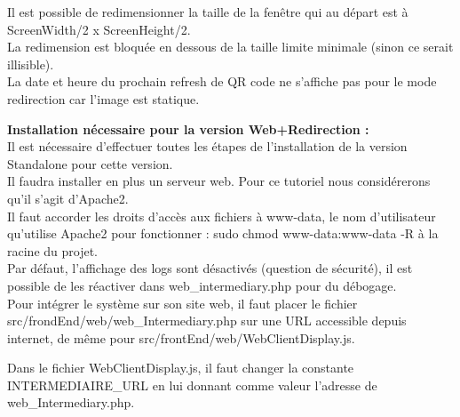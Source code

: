 \documentclass[a4paper,12pt]{article}
\begin{document}
\begin{flushleft}
\begin{enumerate}
    Il est possible de redimensionner la taille de la fenêtre qui au départ est à ScreenWidth/2 x ScreenHeight/2.\\
    La redimension est bloquée en dessous de la taille limite minimale (sinon ce serait illisible).\\

    La date et heure du prochain refresh de QR code ne s'affiche pas pour le mode redirection car l'image est statique.\\
\end{enumerate}
\end{flushleft}

\begin{flushleft}
\textbf{Installation nécessaire pour la version Web+Redirection :}\\
Il est nécessaire d'effectuer toutes les étapes de l'installation de la version Standalone pour cette version.\\
Il faudra installer en plus un serveur web. Pour ce tutoriel nous considérerons qu'il s'agit d'Apache2.\\
Il faut accorder les droits d'accès aux fichiers à www-data, le nom d'utilisateur qu'utilise Apache2 pour fonctionner : sudo chmod www-data:www-data -R à la racine du projet.\\

Par défaut, l'affichage des logs sont désactivés (question de sécurité), il est possible de les réactiver dans web\_intermediary.php pour du débogage.\\


Pour intégrer le système sur son site web, il faut placer le fichier src/frondEnd/web/web\_Intermediary.php sur une URL accessible depuis internet, de même pour  src/frontEnd/web/WebClientDisplay.js.

Dans le fichier WebClientDisplay.js, il faut changer la constante INTERMEDIAIRE\_URL en lui donnant comme valeur l'adresse de web\_Intermediary.php.


\end{flushleft}
\end{document}
